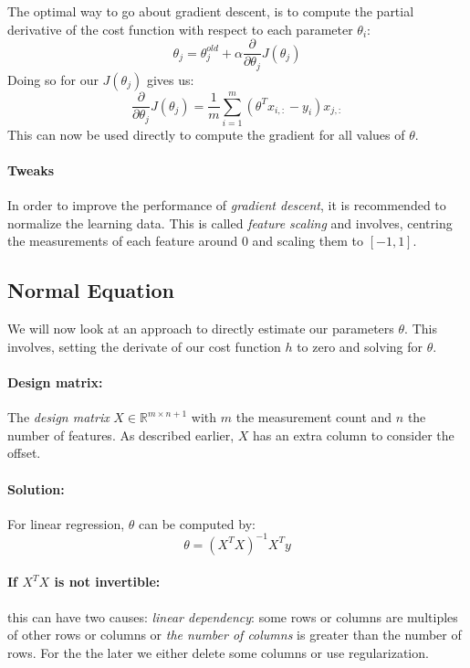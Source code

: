 \documentclass[11pt,a4paper]{article}
\begin{document}
The optimal way to go about gradient descent, is to compute the partial derivative of the cost function with respect to each parameter $\theta_i$:
\begin{equation}
\theta_j = \theta_{j}^{old} + \alpha\frac{\partial}{\partial \theta_j}J(\theta_j)
\end{equation}
Doing so for our $J(\theta_j)$ gives us:
\begin{equation}
\frac{\partial}{\partial \theta_j} J(\theta_j) = \frac{1}{m}\sum\limits_{i=1}^m(\theta^Tx_{i,:}-y_i)x_{j,:}
\end{equation}
This can now be used directly to compute the gradient for all values of $\theta$.

\paragraph{Tweaks}
In order to improve the performance of \emph{gradient descent}, it is recommended to normalize the learning data.
This is called \emph{feature scaling} and involves, centring the measurements of each feature around 0 and scaling them to $[-1,1]$.

\subsection{Normal Equation}
We will now look at an approach to directly estimate our parameters $\theta$.
This involves, setting the derivate of our cost function $h$ to zero and solving for $\theta$.

\paragraph{Design matrix:} The \emph{design matrix} $X \in \mathbb{R}^{m\times n+1}$ with $m$ the measurement count and $n$ the number of features.
As described earlier, $X$ has an extra column to consider the offset.

\paragraph{Solution:} For linear regression, $\theta$ can be computed by:
\begin{equation}
\theta = (X^TX)^{-1}X^Ty
\end{equation}

\paragraph{If $X^TX$ is not invertible:} this can have two causes: \emph{linear dependency}: some rows or columns are multiples of other rows or columns or \emph{the number of columns} is greater than the number of rows.
For the the later we either delete some columns or use regularization.
\end{document}
